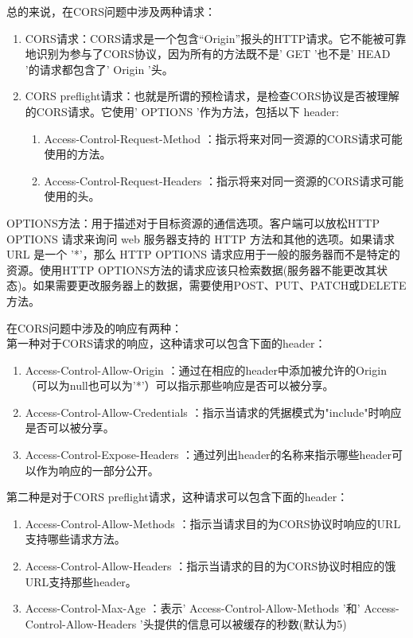 总的来说，在CORS问题中涉及两种请求：

\begin{enumerate}
  \item CORS请求：CORS请求是一个包含“Origin”报头的HTTP请求。它不能被可靠地识别为参与了CORS协议，因为所有的方法既不是' GET '也不是' HEAD '的请求都包含了' Origin '头。
  \item CORS preflight请求：也就是所谓的预检请求，是检查CORS协议是否被理解的CORS请求。它使用' OPTIONS '作为方法，包括以下 header:
        \begin{enumerate}
          \item  Access-Control-Request-Method ：指示将来对同一资源的CORS请求可能使用的方法。
          \item  Access-Control-Request-Headers ：指示将来对同一资源的CORS请求可能使用的头。
        \end{enumerate}
\end{enumerate}

OPTIONS方法：用于描述对于目标资源的通信选项。客户端可以放松HTTP OPTIONS 请求来询问 web 服务器支持的 HTTP 方法和其他的选项。如果请求 URL 是一个 '*'，那么 HTTP OPTIONS 请求应用于一般的服务器而不是特定的资源。使用HTTP OPTIONS方法的请求应该只检索数据(服务器不能更改其状态)。如果需要更改服务器上的数据，需要使用POST、PUT、PATCH或DELETE方法。

在CORS问题中涉及的响应有两种：\\
第一种对于CORS请求的响应，这种请求可以包含下面的header：
\begin{enumerate}
  \item  Access-Control-Allow-Origin ：通过在相应的header中添加被允许的Origin（可以为null也可以为'*'）可以指示那些响应是否可以被分享。
  \item  Access-Control-Allow-Credentials ：指示当请求的凭据模式为"include"时响应是否可以被分享。
  \item  Access-Control-Expose-Headers ：通过列出header的名称来指示哪些header可以作为响应的一部分公开。
\end{enumerate}
第二种是对于CORS preflight请求，这种请求可以包含下面的header：
\begin{enumerate}
  \item  Access-Control-Allow-Methods ：指示当请求目的为CORS协议时响应的URL支持哪些请求方法。
  \item  Access-Control-Allow-Headers ：指示当请求的目的为CORS协议时相应的饿URL支持那些header。
  \item  Access-Control-Max-Age ：表示' Access-Control-Allow-Methods '和' Access-Control-Allow-Headers '头提供的信息可以被缓存的秒数(默认为5)
\end{enumerate}


